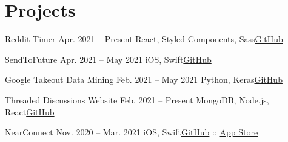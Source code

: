 
\newif\ifshowchips
\showchipsfalse

\newcommand{\javascript}{\ifshowchips \fcolorbox{js}{js}{\bf \scriptsize JS} \fi}
\newcommand{\python}{\ifshowchips \fcolorbox{py}{py}{\bf \scriptsize \textcolor{white}{Python}} \fi}
\newcommand{\swift}{\ifshowchips \fcolorbox{swift}{swift}{\bf \scriptsize Swift} \fi}
\newcommand{\vbnet}{\ifshowchips \fcolorbox{vb}{vb}{\bf \scriptsize \textcolor{white}{VB.NET}} \fi}
\newcommand{\cpp}{\ifshowchips \fcolorbox{cpp}{cpp}{\bf \scriptsize C++} \fi}

\section{Projects}
  \resumeSubHeadingListStart
    \ifwebdev
    \resumeSubheading
      {Reddit Timer \javascript}{Apr. 2021 -- Present}
      {React, Styled Components, Sass}{\href{https://github.com/profydev/reddit-timer-yrahul3910}{GitHub}}
    \fi
  
    \ifios
    \resumeSubheading
      {SendToFuture \swift}{Apr. 2021 -- May 2021}
      {iOS, Swift}{\href{https://github.com/yrahul3910/send-to-future}{GitHub}}
    \fi
      
    \ifml
    \resumeSubheading
      {Google Takeout Data Mining \python}{Feb. 2021 -- May 2021}
      {Python, Keras}{\href{https://github.com/yrahul3910/google-takeout-data-mining}{GitHub}}
    \fi
      
    \ifwebdev
    \resumeSubheading
      {Threaded Discussions Website \javascript}{Feb. 2021 -- Present}
      {MongoDB, Node.js, React}{\href{https://github.com/yrahul3910/threaded-discussions}{GitHub}}
    \fi
  
    \ifios
    \resumeSubheading
      {NearConnect \swift}{Nov. 2020 -- Mar. 2021}
      {iOS, Swift}{\href{https://github.com/yrahul3910/socialqr}{GitHub} :: \href{https://apps.apple.com/us/app/nearconnect/id1547157546}{App Store}}
    \fi
    

